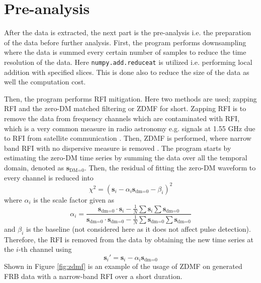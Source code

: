 \section{Pre-analysis}

After the data is extracted, the next part is the pre-analysis i.e. the preparation of the data before further analysis. First, the program performs downsampling where the data is summed every certain number of samples to reduce the time resolution of the data. Here \texttt{numpy.add.reduceat} is utilized i.e. performing local addition with specified slices. This is done also to reduce the size of the data as well the computation cost. 

Then, the program performs RFI mitigation. Here two methods are used; zapping RFI and the zero-DM matched filtering or ZDMF for short. Zapping RFI is to remove the data from frequency channels which are contaminated with RFI, which is a very common measure in radio astronomy e.g. signals at 1.55 GHz due to RFI from satellite communication \cite{Zhang2021}. Then, ZDMF is performed, where narrow band RFI with no dispersive measure is removed \cite{Men2019}. The program starts by estimating the zero-DM time series by summing the data over all the temporal domain, denoted as $\mathbf{s}_{\text{DM=0}}$. Then, the residual of fitting the zero-DM waveform to every channel is reduced into
\begin{equation}
    \chi^2 = (\mathbf{s}_i - \alpha_i\mathbf{s}_{\text{dm=0}} - \beta_i)^2
\end{equation}
where $\alpha_i$ is the scale factor given as 
\begin{equation}
    \alpha_i = \frac{\mathbf{s}_{\text{dm=0}}\cdot\mathbf{s}_i - \frac{1}{N} \sum \mathbf{s}_i \sum \mathbf{s}_{\text{dm=0}}}{\mathbf{s}_{\text{dm=0}}\cdot\mathbf{s}_{\text{dm=0}} - \frac{1}{N} \sum \mathbf{s}_{\text{dm=0}} \sum \mathbf{s}_{\text{dm=0}}}
\end{equation}
and $\beta_i$ is the baseline (not considered here as it does not affect pulse detection). Therefore, the RFI is removed from the data by obtaining the new time series at the $i$-th channel using
\begin{equation}
    \mathbf{s}_i' = \mathbf{s}_i - \alpha_i \mathbf{s}_{\text{dm=0}}
\end{equation}
Shown in Figure \ref{fig:zdmf} is an example of the usage of ZDMF on generated FRB data with a narrow-band RFI over a short duration.
